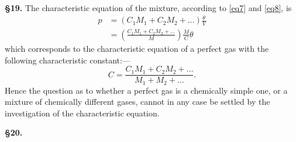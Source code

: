 \documentclass[oneside,12pt]{book}
\begin{document}
\textbf{\S 19.} The characteristic equation of the mixture, according to \eqref{eq7} and \eqref{eq8}, is 
\begin{align*}
    p&=(C_1M_1+C_2M_2+\dots)\frac{\theta}{V} \\
    &=\left(\frac{C_1M_1+C_2M_2+\dots}{M}\right)\frac{M}{C}\theta 
    \tag{10}
    \label{eq10}
\end{align*}
\setcounter{equation}{10}
which corresponds to the characteristic equation of a perfect gas with the following characteristic constant:---
\begin{equation}
    C=\frac{C_1M_1+C_2M_2+\dots}{M_1+M_2+\dots}. 
    \label{eq11}
\end{equation}
Hence the question as to whether a perfect gas is a chemically simple one, or a mixture of chemically different gases, cannot in any case be settled by the investigation of the characteristic equation. \par 

\textbf{\S 20.}
\end{document}
